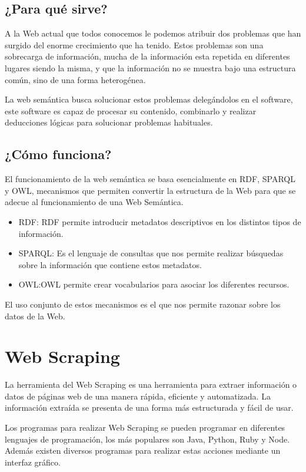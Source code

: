 \subsection{¿Para qué sirve?}

A la Web actual que todos conocemos le podemos atribuir dos problemas que han surgido del enorme crecimiento que ha tenido. Estos problemas son una sobrecarga de información, mucha de la información esta repetida en diferentes lugares siendo la misma, y que la información no se muestra bajo una estructura común, sino de una forma heterogénea.

La web semántica busca solucionar estos problemas delegándolos en el software, este software es capaz de procesar su contenido, combinarlo y realizar deducciones lógicas para solucionar problemas habituales.

\subsection{¿Cómo funciona?}

El funcionamiento de la web semántica se basa esencialmente en RDF, SPARQL y OWL, mecanismos que permiten convertir la estructura de la Web para que se adecue al funcionamiento de una Web Semántica.
\begin{itemize}
	\item{RDF}: RDF permite introducir metadatos descriptivos en los distintos tipos de información.
	\item{SPARQL}: Es el lenguaje de consultas que nos permite realizar búsquedas sobre la información que contiene estos metadatos.
	\item{OWL}:OWL permite crear vocabularios para asociar los diferentes recursos.
\end{itemize}

El uso conjunto de estos mecanismos es el que nos permite razonar sobre los datos de la Web.
\cite{webSemantica}
\section{Web Scraping}

La herramienta del Web Scraping es una herramienta para extraer información o datos de páginas web de una manera rápida, eficiente y automatizada. La información extraída se presenta de una forma más estructurada y fácil de usar.

Los programas para realizar Web Scraping se pueden programar en diferentes lenguajes de programación, los más populares son Java, Python, Ruby y Node. Además existen diversos programas para realizar estas acciones mediante un interfaz gráfico.

